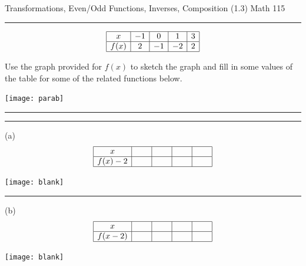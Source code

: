 \documentclass[12pt]{article}
\begin{document}
{\sc \noindent Transformations, Even/Odd Functions, Inverses, Composition (1.3) \hfill Math 115}  \hrule

%

\begin{minipage}[t][][c]{0.5\textwidth}
	
	\bigskip
	
	$$\begin{array}{|c|c|c|c|c|} \hline
	x  & -1 & 0 & 1 & 3 \\ \hline
	f(x)  & 2  & -1 & -2  & 2  \\
	\hline
	\end{array}$$	
	
	Use the graph provided for $f(x)$ to sketch the graph and fill in some values of the table for some of the related functions below.
\end{minipage} \hfill \texttt{[image: parab]}

\hrule
\smallskip
\hrule

\begin{minipage}[t][][c]{0.5\textwidth}

\bigskip

(a) $$\begin{array}{|c|c|c|c|c|} \hline
x  & \hspace{.2in} & \hspace{.2in} & \hspace{.2in} & \hspace{.2in} \\ \hline
f(x)-2 &   &  &  &   \\
\hline
\end{array}$$

\end{minipage} \hfill \texttt{[image: blank]}


\hrule

\begin{minipage}[t][][c]{0.5\textwidth}

\bigskip

(b) $$\begin{array}{|c|c|c|c|c|} \hline
x  & \hspace{.2in} & \hspace{.2in} & \hspace{.2in} & \hspace{.2in} \\ \hline
f(x-2) &   &  &  &   \\
\hline
\end{array}$$

\end{minipage} \hfill \texttt{[image: blank]}
\end{document}
